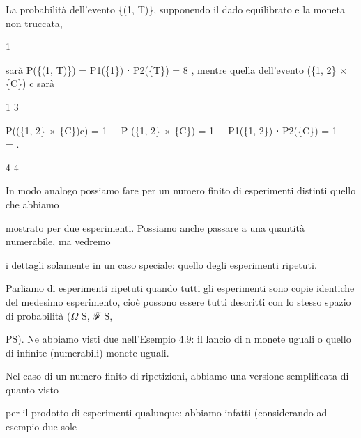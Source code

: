\documentclass[a4paper,portrait,12pt]{article}
\begin{document}
\begin{flushleft}
La probabilit\`{a} dell'evento \{(1, T)\}, supponendo il dado equilibrato e la moneta non truccata,
\end{flushleft}


1


\begin{flushleft}
sar\`{a} P(\{(1, T)\}) = P1(\{1\}) ⋅ P2(\{T\}) = 8 , mentre quella dell'evento (\{1, 2\} × \{C\}) c sar\`{a}
\end{flushleft}


1 3


\begin{flushleft}
P((\{1, 2\} × \{C\})c) = 1 $-$ P (\{1, 2\} × \{C\}) = 1 $-$ P1(\{1, 2\}) ⋅ P2(\{C\}) = 1 $-$ = .
\end{flushleft}


4 4


\begin{flushleft}
In modo analogo possiamo fare per un numero finito di esperimenti distinti quello che abbiamo
\end{flushleft}


\begin{flushleft}
mostrato per due esperimenti. Possiamo anche passare a una quantit\`{a} numerabile, ma vedremo
\end{flushleft}


\begin{flushleft}
i dettagli solamente in un caso speciale: quello degli esperimenti ripetuti.
\end{flushleft}


\begin{flushleft}
Parliamo di esperimenti ripetuti quando tutti gli esperimenti sono copie identiche del medesimo esperimento, cio\`{e} possono essere tutti descritti con lo stesso spazio di probabilit\`{a} ($\Omega$ S, ℱ S,
\end{flushleft}


\begin{flushleft}
PS). Ne abbiamo visti due nell'Esempio 4.9: il lancio di n monete uguali o quello di infinite (numerabili) monete uguali.
\end{flushleft}


\begin{flushleft}
Nel caso di un numero finito di ripetizioni, abbiamo una versione semplificata di quanto visto
\end{flushleft}


\begin{flushleft}
per il prodotto di esperimenti qualunque: abbiamo infatti (considerando ad esempio due sole
\end{flushleft}
\end{document}
